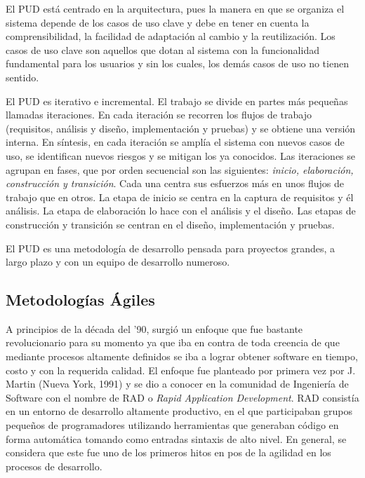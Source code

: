     El PUD está centrado en la arquitectura, pues la manera en que se organiza el sistema depende de los casos de uso clave y debe en tener en cuenta la comprensibilidad, la facilidad de adaptación al cambio y la reutilización. Los casos de uso clave son aquellos que dotan al sistema con la funcionalidad fundamental para los usuarios y sin los cuales, los demás casos de uso no tienen sentido.
  
    El PUD es iterativo e incremental. El trabajo se divide en partes más pequeñas llamadas iteraciones. En cada iteración se recorren los flujos de trabajo (requisitos, análisis y diseño, implementación y pruebas) y se obtiene una versión interna. En síntesis, en cada iteración se amplía el sistema con nuevos casos de uso, se identifican nuevos riesgos y se mitigan los ya conocidos. Las iteraciones se agrupan en fases, que por orden secuencial son las siguientes: {\it inicio, elaboración, construcción y transición}. Cada una centra sus esfuerzos más en unos flujos de trabajo que en otros. La etapa de inicio se centra en la captura de requisitos y él análisis. La etapa de elaboración lo hace con el análisis y el diseño. Las etapas de construcción y transición se centran en el diseño, implementación y pruebas.
  
    El PUD es una metodología de desarrollo pensada para proyectos grandes, a largo plazo  y con un equipo de desarrollo numeroso.


  \subsection{Metodologías Ágiles} %
    \label{sub:metodologias_agiles}
    
    A principios de la década del ’90, surgió un enfoque que fue bastante revolucionario para su momento ya que iba en contra de toda creencia de que mediante procesos altamente definidos se iba a lograr obtener software en tiempo, costo y con la requerida calidad. El enfoque fue planteado por primera vez por J. Martin (Nueva York, 1991)  y se dio a conocer en la comunidad de Ingeniería de Software con el nombre de RAD o {\it Rapid Application Development}. RAD consistía en un entorno de desarrollo altamente productivo, en el que participaban grupos pequeños de programadores utilizando herramientas que generaban código en forma automática tomando como entradas sintaxis de alto nivel. En general, se considera que este fue uno de los primeros hitos en pos de la agilidad en los procesos de desarrollo.
    
